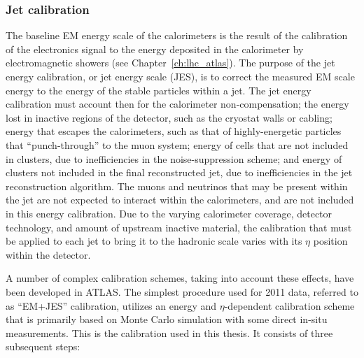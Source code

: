 \subsubsection{Jet calibration}\label{sec:calib}

The baseline EM energy scale of the calorimeters is the result of the calibration of the electronics signal to the energy deposited in the calorimeter by electromagnetic showers (see Chapter~\ref{ch:lhc_atlas}).
The purpose of the jet energy calibration, or jet energy scale (JES), is to correct the measured EM scale energy to the energy of the stable particles within a jet.  The jet energy calibration must account then for the calorimeter non-compensation; the energy lost in inactive regions of the detector, such as the cryostat walls or cabling; energy that escapes the calorimeters, such as that of highly-energetic particles that ``punch-through'' to the muon system; energy of cells that are not included in clusters, due to inefficiencies in the noise-suppression scheme; and energy of clusters not included in the final reconstructed jet, due to inefficiencies in the jet reconstruction algorithm. The muons and neutrinos that may be present within the jet are not expected to interact within the calorimeters, and are not included in this energy calibration.
Due to the varying calorimeter coverage, detector technology, and amount of upstream inactive material, the calibration that must be applied to each jet to bring it to the hadronic scale varies with its $\eta$ position within the detector. 

A number of complex calibration schemes, taking into account these effects, have been developed in ATLAS. The simplest procedure used for 2011 data, referred to as ``EM+JES'' calibration, utilizes an energy and $\eta$-dependent calibration scheme that is primarily based on Monte Carlo simulation with some direct in-situ measurements. This is the calibration used in this thesis. It consists of three subsequent steps:

